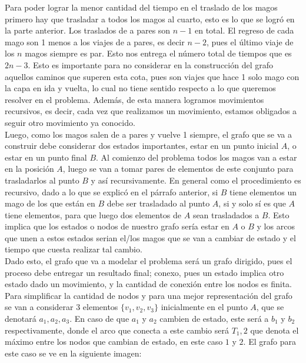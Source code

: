 \documentclass[letterpaper,10pt,table, dvipsnames]{article}
\begin{document}
Para poder lograr la menor cantidad del tiempo en el traslado de los magos primero hay que trasladar a todos los magos al cuarto, esto es lo que se logró en la parte anterior. Los traslados de a pares son $n-1$ en total. El regreso de cada mago son 1 menos a los viajes de a pares, es decir $n-2$, pues el último viaje de los $n$ magos siempre es par. Esto nos entrega el número total de tiempos que es $2n-3$. Esto es importante para no considerar en la construcción del grafo aquellos caminos que superen esta cota, pues son viajes que hace 1 solo mago con la capa en ida y vuelta, lo cual no tiene sentido respecto a lo que queremos resolver en el problema. Además, de esta manera logramos movimientos recursivos, es decir, cada vez que realizamos un movimiento, estamos obligados a seguir otro movimiento ya conocido.\\

Luego, como los magos salen de a pares y vuelve 1 siempre, el grafo que se va a construir debe considerar dos estados importantes, estar en un punto inicial $A$, o estar en un punto final $B$. Al comienzo del problema todos los magos van a estar en la posición $A$, luego se van a tomar pares de elementos de este conjunto para trasladarlos al punto $B$ y así recursivamente. En general como el procedimiento es recursivo, dado a lo que se explicó en el párrafo anterior, si $B$ tiene elementos un mago de los que están en $B$ debe ser trasladado al punto $A$, si y solo sí es que $A$ tiene elementos, para que luego dos elementos de $A$ sean trasladados a $B$. Esto implica que los estados o nodos de nuestro grafo sería estar en $A$ o $B$ y los arcos que unen a estos estados serian el/los magos que se van a cambiar de estado y el tiempo que cuesta realizar tal cambio.\\

Dado esto, el grafo que va a modelar el problema será un grafo dirigido, pues el proceso debe entregar un resultado final; conexo, pues un estado implica otro estado dado un movimiento, y la cantidad de conexión entre los nodos es finita.\\

Para simplificar la cantidad de nodos y para una mejor representación del grafo se van a considerar 3 elementos $\{v_{1},v_2, v_3\}$ inicialmente en el punto $A$, que se denotará $a_1, a_2, a_3$. En caso de que $a_1$ y $a_2$ cambien de estado, este será a $b_1$ y $b_2$ respectivamente, donde el arco que conecta a este cambio será $T_1,2$ que denota el máximo entre los nodos que cambian de estado, en este caso $1$ y $2$. El grafo para este caso se ve en la siguiente imagen:
\end{document}
